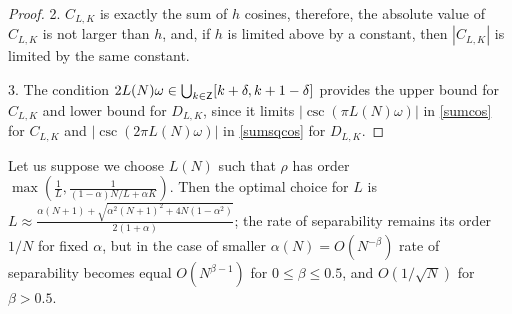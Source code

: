 \documentclass[sii]{ipart}
\begin{document}
\begin{proof}
    2. $C_{L,K}$ is exactly the sum of $h$ cosines, therefore, the absolute value of $C_{L,K}$ is not larger than $h$, and, if $h$ is limited above by a constant, then $|C_{L,K}|$ is limited by the same constant.
    
    3. The condition $2 L(N) \omega \in \bigcup_{k \in \mathsf{Z}} [k + \delta, k + 1 - \delta]$ provides the upper bound for $C_{L,K}$ and lower bound for $D_{L,K}$, since it limits $|\csc(\pi L(N) \omega)|$ in \eqref{sumcos} for $C_{L,K}$ and $|\csc(2 \pi L(N) \omega)|$ in \eqref{sumsqcos} for $D_{L,K}$.
\end{proof}

Let us suppose we choose $L(N)$ such that $\rho$ has order $\max\left(\frac{1}{L}, \frac{1}{(1-\alpha)N/L+\alpha K}\right)$. Then the optimal choice for $L$ is $L \approx \frac{\alpha(N + 1) + \sqrt{\alpha^2(N+1)^2 + 4N(1  - \alpha^2)}}{2(1 + \alpha)}$; the rate of separability remains its order $1/N$ for fixed $\alpha$, but in the case of smaller $\alpha(N) = O(N^{-\beta})$ rate of separability becomes equal $O(N^{\beta - 1})$ for $0 \le \beta \le 0.5$, and $O(1/\sqrt{N})$ for $\beta > 0.5$.
\end{document}
